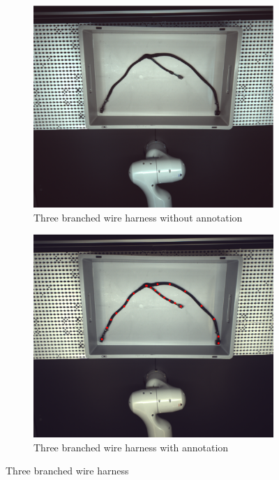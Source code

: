 \begin{figure}[htbp]
    \centering
    \begin{subfigure}[b]{0.45\textwidth}
        \centering
        \includegraphics[width=0.9\linewidth]{example_images/img_0}
        \caption{Three branched wire harness without annotation}
        \label{fig:Three branched wire harness original}
    \end{subfigure}
    \hfill
    \begin{subfigure}[b]{0.45\textwidth}
        \centering
        \includegraphics[width=0.9\linewidth]{example_images/img_0_anno}
        \caption{Three branched wire harness with annotation}
        \label{fig:Three branched wire harness with annotation}
    \end{subfigure}
    
    \caption{Three branched wire harness}
    \label{fig:Three branched wire harness}
\end{figure}
